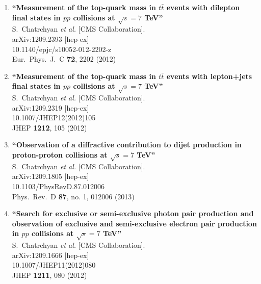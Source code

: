 \documentclass{article}
\begin{document}
\begin{enumerate}
\item%
{\bf ``Measurement of the top-quark mass in $t\bar{t}$ events with dilepton final states in $pp$ collisions at $\sqrt{s}=7$ TeV''}
  \\{}S.~Chatrchyan {\it et al.}  [CMS Collaboration].
  \\{}arXiv:1209.2393 [hep-ex]
    \\{}10.1140/epjc/s10052-012-2202-z
\\{}Eur.\ Phys.\ J.\ C {\bf 72}, 2202 (2012) %


\item%
{\bf ``Measurement of the top-quark mass in $t\bar{t}$ events with lepton+jets final states in $pp$ collisions at $\sqrt{s}=7$ TeV''}
  \\{}S.~Chatrchyan {\it et al.}  [CMS Collaboration].
  \\{}arXiv:1209.2319 [hep-ex]
    \\{}10.1007/JHEP12(2012)105
\\{}JHEP {\bf 1212}, 105 (2012) %


\item%
{\bf ``Observation of a diffractive contribution to dijet production in proton-proton collisions at $\sqrt{s}=7$ TeV''}
  \\{}S.~Chatrchyan {\it et al.}  [CMS Collaboration].
  \\{}arXiv:1209.1805 [hep-ex]
    \\{}10.1103/PhysRevD.87.012006
\\{}Phys.\ Rev.\ D {\bf 87}, no. 1, 012006 (2013) %


\item%
{\bf ``Search for exclusive or semi-exclusive photon pair production and observation of exclusive and semi-exclusive electron pair production in $pp$ collisions at $\sqrt{s}=7$ TeV''}
  \\{}S.~Chatrchyan {\it et al.}  [CMS Collaboration].
  \\{}arXiv:1209.1666 [hep-ex]
    \\{}10.1007/JHEP11(2012)080
\\{}JHEP {\bf 1211}, 080 (2012) %



\end{enumerate}
\end{document}
